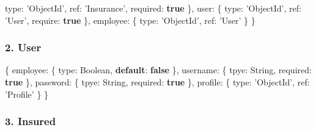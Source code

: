 \documentclass[
]{article}
\newenvironment{Shaded}{}{}
\newcommand{\ControlFlowTok}[1]{\textcolor[rgb]{0.00,0.44,0.13}{\textbf{#1}}}
\newcommand{\DataTypeTok}[1]{\textcolor[rgb]{0.56,0.13,0.00}{#1}}
\newcommand{\KeywordTok}[1]{\textcolor[rgb]{0.00,0.44,0.13}{\textbf{#1}}}
\newcommand{\NormalTok}[1]{#1}
\newcommand{\OperatorTok}[1]{\textcolor[rgb]{0.40,0.40,0.40}{#1}}
\newcommand{\StringTok}[1]{\textcolor[rgb]{0.25,0.44,0.63}{#1}}
\begin{document}
\begin{Shaded}
\begin{Highlighting}[]
        \DataTypeTok{type}\OperatorTok{:} \StringTok{'ObjectId'}\OperatorTok{,}
        \DataTypeTok{ref}\OperatorTok{:} \StringTok{'Insurance'}\OperatorTok{,}
        \DataTypeTok{required}\OperatorTok{:} \KeywordTok{true}
    \OperatorTok{\},}
    \DataTypeTok{user}\OperatorTok{:} \OperatorTok{\{}
        \DataTypeTok{type}\OperatorTok{:} \StringTok{'ObjectId'}\OperatorTok{,}
        \DataTypeTok{ref}\OperatorTok{:} \StringTok{'User'}\OperatorTok{,}
        \DataTypeTok{require}\OperatorTok{:} \KeywordTok{true}
    \OperatorTok{\},}
    \DataTypeTok{employee}\OperatorTok{:} \OperatorTok{\{}
        \DataTypeTok{type}\OperatorTok{:} \StringTok{'ObjectId'}\OperatorTok{,}
        \DataTypeTok{ref}\OperatorTok{:} \StringTok{'User'}
    \OperatorTok{\}}
\OperatorTok{\}}
\end{Highlighting}
\end{Shaded}

\hypertarget{header-n10}{%
\subsubsection{2. User}\label{header-n10}}

\begin{Shaded}
\begin{Highlighting}[]
\OperatorTok{\{}
    \DataTypeTok{employee}\OperatorTok{:} \OperatorTok{\{}
        \DataTypeTok{type}\OperatorTok{:}\NormalTok{ Boolean}\OperatorTok{,}
        \ControlFlowTok{default}\OperatorTok{:} \KeywordTok{false}
    \OperatorTok{\},}
    \DataTypeTok{username}\OperatorTok{:} \OperatorTok{\{}
		\DataTypeTok{tpye}\OperatorTok{:}\NormalTok{ String}\OperatorTok{,}
        \DataTypeTok{required}\OperatorTok{:} \KeywordTok{true}
    \OperatorTok{\},}
    \DataTypeTok{password}\OperatorTok{:} \OperatorTok{\{}
        \DataTypeTok{tpye}\OperatorTok{:}\NormalTok{ String}\OperatorTok{,}
        \DataTypeTok{required}\OperatorTok{:} \KeywordTok{true}
    \OperatorTok{\},}
    \DataTypeTok{profile}\OperatorTok{:} \OperatorTok{\{}
        \DataTypeTok{type}\OperatorTok{:} \StringTok{'ObjectId'}\OperatorTok{,}
        \DataTypeTok{ref}\OperatorTok{:} \StringTok{'Profile'}
    \OperatorTok{\}}
\OperatorTok{\}}
\end{Highlighting}
\end{Shaded}

\hypertarget{header-n12}{%
\subsubsection{3. Insured}\label{header-n12}}
\end{document}
